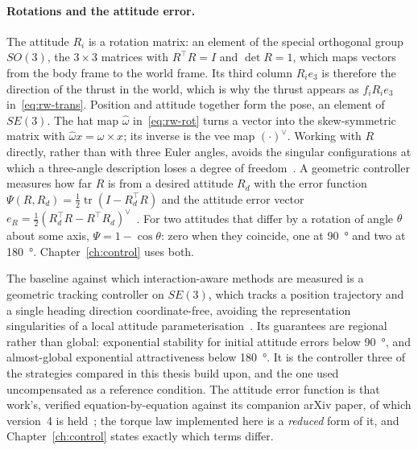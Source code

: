 \paragraph{Rotations and the attitude error.}
The attitude $R_i$ is a rotation matrix: an element of the special orthogonal group $SO(3)$, the
$3\times3$ matrices with $R^\top R = I$ and $\det R = 1$, which maps vectors from the body frame
to the world frame. Its third column $R_i e_3$ is therefore the direction of the thrust in the
world, which is why the thrust appears as $f_i R_i e_3$ in~\eqref{eq:rw-trans}. Position and
attitude together form the pose, an element of $SE(3)$. The hat map $\hat{\omega}$ in~\eqref{eq:rw-rot}
turns a vector into the skew-symmetric matrix with $\hat{\omega} x = \omega \times x$; its inverse
is the vee map $(\cdot)^\vee$. Working with $R$ directly, rather than with three Euler angles,
avoids the singular configurations at which a three-angle description loses a degree of
freedom~\cite{lee2010geometricse3}. A geometric controller measures how far $R$ is from a desired
attitude $R_d$ with the error function $\Psi(R, R_d) = \tfrac12 \operatorname{tr}(I - R_d^\top R)$
and the attitude error vector $e_R = \tfrac12 (R_d^\top R - R^\top R_d)^\vee$~\cite{lee2010geometricse3}.
For two attitudes that differ by a rotation of angle $\theta$ about some axis, $\Psi = 1 - \cos\theta$:
zero when they coincide, one at \SI{90}{\degree} and two at \SI{180}{\degree}. Chapter~\ref{ch:control}
uses both.

The baseline against which interaction-aware methods are measured is a geometric tracking
controller on $SE(3)$, which tracks a position trajectory and a single heading direction
coordinate-free, avoiding the representation singularities of a local attitude
parameterisation~\cite{lee2010geometrictracking}. Its guarantees are regional rather than global:
exponential stability for initial attitude errors below \SI{90}{\degree}, and almost-global
exponential attractiveness below \SI{180}{\degree}. It is the controller three of the
strategies compared in this thesis build upon, and the one used uncompensated as a reference
condition. The attitude error function is that work's, verified equation-by-equation against its
companion arXiv paper, of which version~4 is held~\cite{lee2010geometricse3}; the torque law implemented here is a
\emph{reduced} form of it, and Chapter~\ref{ch:control} states exactly which terms differ.

